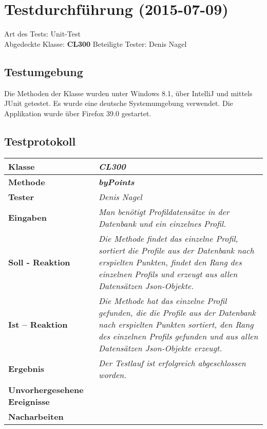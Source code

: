 
\chapter{Testdurchführung (2015-07-09)}

Art des Tests: Unit-Test\\
Abgedeckte Klasse: \textbf{CL300}
Beteiligte Tester: Denis Nagel\\

\section{Testumgebung}

Die Methoden der Klasse wurden unter Windows 8.1, über IntelliJ und mittels JUnit getestet. Es wurde eine deutsche Systemumgebung verwendet. Die Applikation wurde über Firefox 39.0 gestartet.

\section{Testprotokoll}

\begin{longtable}{|p{4cm}|p{11cm}|}
\hline
\textbf{Klasse} & \textit{\textbf{CL300}} \\
\hline
\textbf{Methode} & \textit{\textbf{byPoints}} \\
\hline
\textbf{Tester} & \textit{Denis Nagel} \\
\hline
\textbf{Eingaben} & \textit{Man benötigt Profildatensätze in der Datenbank und ein einzelnes Profil.} \\
\hline
\textbf{Soll - Reaktion} & \textit{Die Methode findet das einzelne Profil, sortiert die Profile aus der Datenbank nach erspielten Punkten, findet den Rang des einzelnen Profils und erzeugt aus allen Datensätzen Json-Objekte.} \\
\hline
\textbf{Ist -- Reaktion} & \textit{Die Methode hat das einzelne Profil gefunden, die die Profile aus der Datenbank nach erspielten Punkten sortiert, den Rang des einzelnen Profils gefunden und aus allen Datensätzen Json-Objekte erzeugt.} \\
\hline
\textbf{Ergebnis} & \textit{Der Testlauf ist erfolgreich abgeschlossen worden.} \\
\hline
\textbf{Unvorhergesehene Ereignisse} &
\textit{} \\
\hline
\textbf{Nacharbeiten } & \textit{} \\
\hline
\end{longtable}

